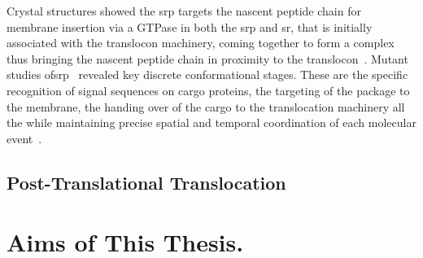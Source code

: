 Crystal structures showed the \gls{srp} targets the nascent peptide chain for membrane insertion via a GTPase in both the \gls{srp} and \gls{sr}, that is initially associated with the translocon machinery, coming together to form a complex thus bringing the nascent peptide chain in proximity to the translocon~\cite{Shan2005}.
Mutant studies of\gls{srp}~\cite{Shan2005} revealed key discrete conformational stages.
These are the specific recognition of signal sequences on cargo proteins, the targeting of the package to the membrane, the handing over of the cargo to the translocation machinery all the while maintaining precise spatial and temporal coordination of each molecular event~\cite{Saraogi2011}.


\subsection{Post-Translational Translocation}



\section{Aims of This Thesis.}

